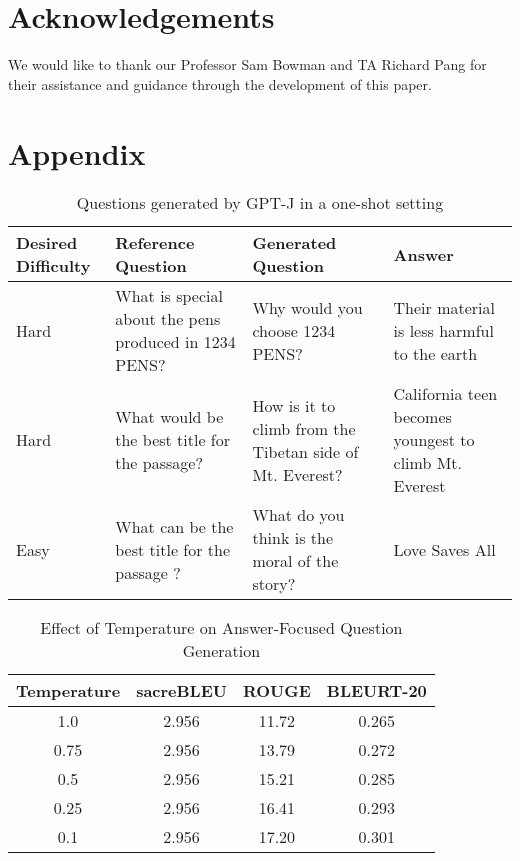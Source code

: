 \documentclass[11pt]{article}
\begin{document}
\section*{Acknowledgements}

We would like to thank our Professor Sam Bowman and TA Richard Pang for their assistance and guidance through the development of this paper.

\newpage



\clearpage

\appendix
\section{Appendix}

\begin{table}[!hbt]
\centering
\begin{tabular}{|p{3cm}|p{4cm}|p{4cm}|p{3.5cm}|}
\hline
\textbf{Desired Difficulty} & \textbf{Reference Question} & \textbf{Generated Question} & \textbf{Answer}\\
\hline
Hard & 
What is special about the pens produced in 1234 PENS? & 
Why would you choose 1234 PENS? &  
Their material is less harmful to the earth\\
\hline
Hard & 
What would be the best title for the passage?  & 
How is it to climb from the Tibetan side of Mt. Everest? & 
California teen becomes youngest to climb Mt. Everest\\
\hline
Easy & 
What can be the best title for the passage ? & 
What do you think is the moral of the story? & 
Love Saves All\\
\hline
\end{tabular}
\caption{\label{citation-guide}
Questions generated by GPT-J in a one-shot setting}
\end{table}

\begin{table}[]
\begin{tabular}{|c|c|c|c|}
\hline\hline
\textbf{Temperature} & \textbf{sacreBLEU} & \textbf{ROUGE} & \textbf{BLEURT-20} \\
\hline\hline
1.0                  & 2.956              & 11.72          & 0.265              \\ \hline
0.75                 & 2.956              & 13.79          & 0.272              \\ \hline
0.5                  & 2.956              & 15.21          & 0.285              \\ \hline
0.25                 & 2.956              & 16.41          & 0.293              \\ \hline
0.1                  & 2.956              & 17.20          & 0.301             \\ \hline
\end{tabular}
\caption{\label{citation-guide}
Effect of Temperature on Answer-Focused Question Generation}
\end{table}
 
\end{document}
